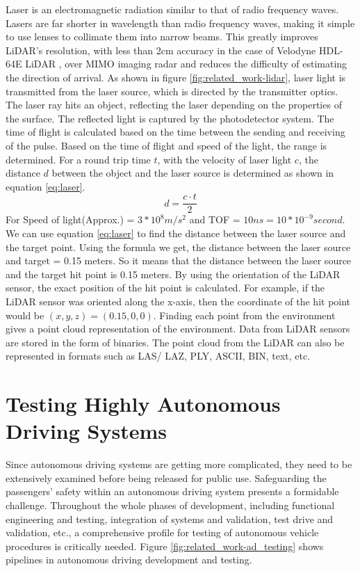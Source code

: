 Laser is an electromagnetic radiation similar to that of radio frequency waves. Lasers are far shorter in wavelength than radio frequency waves, making it simple to use lenses to collimate them into narrow beams. This greatly improves LiDAR's resolution, with less than 2cm accuracy in the case of Velodyne HDL-64E LiDAR \parencite{velodyne_64}, over MIMO imaging radar and reduces the difficulty of estimating the direction of arrival. As shown in figure \ref{fig:related_work-lidar}, laser light is transmitted from the laser source, which is directed by the transmitter optics. The laser ray hits an object, reflecting the laser depending on the properties of the surface. The reflected light is captured by the photodetector system. The time of flight is calculated based on the time between the sending and receiving of the pulse. Based on the time of flight and speed of the light, the range is determined. For a round trip time \(t\), with the velocity of laser light \(c\), the distance \(d\) between the object and the laser source is determined as shown in equation \ref{eq:laser}.
\begin{equation}\label{eq:laser}
    d = \frac{c \cdot t}{2}
\end{equation}
For Speed of light(Approx.) = \(3 * 10^8 m/s^2\) and TOF = \(10 ns = 10 * 10^{-9} second\). We can use equation \ref{eq:laser} to find the distance between the laser source and the target point. Using the formula we get, the distance between the laser source and target = 0.15 meters. So it means that the distance between the laser source and the target hit point is 0.15 meters. By using the orientation of the LiDAR sensor, the exact position of the hit point is calculated. For example, if the LiDAR sensor was oriented along the x-axis, then the coordinate of the hit point would be \((x, y, z) = (0.15, 0, 0)\). Finding each point from the environment gives a point cloud representation of the environment. Data from LiDAR sensors are stored in the form of binaries. The point cloud from the LiDAR can also be represented in formats such as LAS/ LAZ, PLY, ASCII, BIN, text, etc.

\section{Testing Highly Autonomous Driving Systems}
Since autonomous driving systems are getting more complicated, they need to be extensively examined before being released for public use. Safeguarding the passengers' safety within an autonomous driving system presents a formidable challenge. Throughout the whole phases of development, including functional engineering and testing, integration of systems and validation, test drive and validation, etc., a comprehensive profile for testing of autonomous vehicle procedures is critically needed. Figure \ref{fig:related_work-ad_testing} shows pipelines in autonomous driving development and testing.

